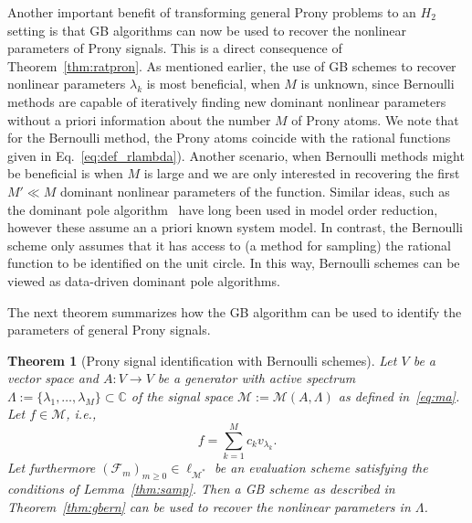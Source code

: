 \documentclass{arxiv}
\newcommand{\cM}{\mathcal{M}}
\newtheorem{theorem}{Theorem}[section]
\begin{document}
Another important benefit of transforming general Prony problems to an $H_2$ setting is that GB algorithms can now be used to recover the nonlinear parameters of Prony signals. This is a direct consequence of Theorem~\ref{thm:ratpron}. As mentioned earlier, the use of GB schemes to recover nonlinear parameters $\lambda_k$ is most beneficial, when $M$ is unknown, since Bernoulli methods are capable of iteratively finding new dominant nonlinear parameters without a priori information about the number $M$ of Prony atoms. We note that for the Bernoulli method, the Prony atoms coincide with the rational functions given in Eq.~\eqref{eq:def_rlambda}). Another scenario, when Bernoulli methods might be beneficial is when $M$ is large and we are only interested in recovering the first $M' \ll M$ dominant nonlinear parameters of the function. Similar ideas, such as the dominant pole algorithm~\cite{martins2002dominant, rommes2008convergence} have long been used in model order reduction, however these assume an a priori known system model. In contrast, the Bernoulli scheme only assumes that it has access to (a method for sampling) the rational function to be identified on the unit circle. In this way, Bernoulli schemes can be viewed as data-driven dominant pole algorithms. 

The next theorem summarizes how the GB  algorithm can be used to identify the parameters of general Prony signals.

\begin{theorem}[Prony signal identification with Bernoulli schemes]
\label{thm:pronbern}
  Let $V$ be a vector space and $A : V \to V$ be a generator with active spectrum $\Lambda := \{ \lambda_1, \ldots, \lambda_M \} \subset \mathbb{C}$ of the signal space $\cM := \cM(A,\Lambda)$ as defined in~\eqref{eq:ma}.  Let $f \in \cM$, i.e.,
  \begin{equation*}
     f = \sum_{k=1}^{M} c_k v_{\lambda_k}.
  \end{equation*}
  Let furthermore ${(\mathcal{F}_m)}_{m \ge 0} \in \ell_{\cM^*}$ be an evaluation scheme satisfying the conditions of Lemma~\ref{thm:samp}. Then a GB scheme as described in Theorem~\ref{thm:gbern} can be used to recover the nonlinear parameters in $\Lambda$.
\end{theorem}
\end{document}
